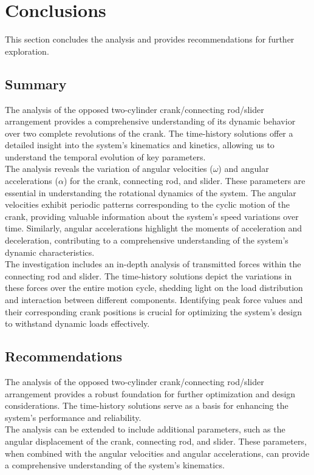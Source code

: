 \documentclass[12pt, titlepage]{article}
\begin{document}
\section{Conclusions}
This section concludes the analysis and provides recommendations for further
exploration.
\subsection{Summary}
The analysis of the opposed two-cylinder crank/connecting rod/slider
arrangement provides a comprehensive understanding of its dynamic behavior over
two complete revolutions of the crank. The time-history solutions offer a
detailed insight into the system's kinematics and kinetics, allowing us to
understand the temporal evolution of key parameters.\\[10pt]
The analysis reveals the variation of angular velocities ($\omega$) and angular
accelerations ($\alpha$) for the crank, connecting rod, and slider. These
parameters are essential in understanding the rotational dynamics of the
system. The angular velocities exhibit periodic patterns corresponding to the
cyclic motion of the crank, providing valuable information about the system's
speed variations over time. Similarly, angular accelerations highlight the
moments of acceleration and deceleration, contributing to a comprehensive
understanding of the system's dynamic characteristics.\\[10pt]
The investigation includes an in-depth analysis of transmitted forces within
the connecting rod and slider. The time-history solutions depict the variations
in these forces over the entire motion cycle, shedding light on the load
distribution and interaction between different components. Identifying peak
force values and their corresponding crank positions is crucial for optimizing
the system's design to withstand dynamic loads effectively.
\subsection{Recommendations}
The analysis of the opposed two-cylinder crank/connecting rod/slider
arrangement provides a robust foundation for further optimization and design
considerations. The time-history solutions serve as a basis for enhancing the
system's performance and reliability.\\[10pt]
The analysis can be extended to include additional parameters, such as the
angular displacement of the crank, connecting rod, and slider. These
parameters, when combined with the angular velocities and angular
accelerations, can provide a comprehensive understanding of the system's
kinematics.
\newpage
\end{document}
